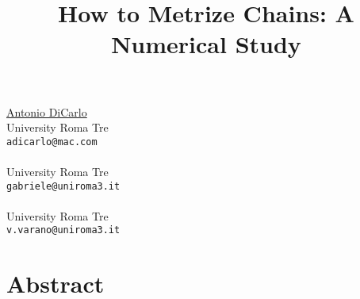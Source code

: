 
\title{How to Metrize Chains: A Numerical Study}
\author{}  \institute{}
\maketitle
\begin{center}
{\large \underline{Antonio DiCarlo}}\\
University Roma Tre\\
{\tt adicarlo@mac.com}
\\ \vspace{4mm}{\large Stefano Gabriele}\\
University Roma Tre\\
{\tt gabriele@uniroma3.it}
\\ \vspace{4mm}{\large Valerio Varano}\\
University Roma Tre\\
{\tt v.varano@uniroma3.it}

\end{center}

\section*{Abstract}

